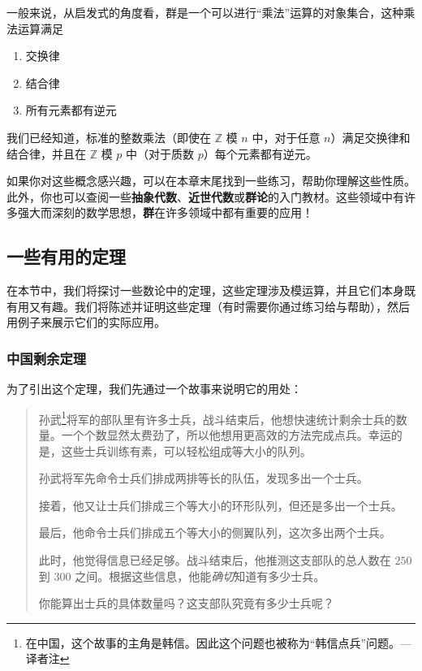 一般来说，从启发式的角度看，群是一个可以进行``乘法''运算的对象集合，这种乘法运算满足
\begin{enumerate}[label=(\alph*)]
    \item 交换律
    \item 结合律
    \item 所有元素都有逆元
\end{enumerate}
我们已经知道，标准的整数乘法（即使在 $\mathbb{Z}$ 模 $n$ 中，对于任意 $n$）满足交换律和结合律，并且在 $\mathbb{Z}$ 模 $p$ 中（对于质数 $p$）每个元素都有逆元。

如果你对这些概念感兴趣，可以在本章末尾找到一些练习，帮助你理解这些性质。此外，你也可以查阅一些\textbf{抽象代数}、\textbf{近世代数}或\textbf{群论}的入门教材。这些领域中有许多强大而深刻的数学思想，\textbf{群}在许多领域中都有重要的应用！

\subsection{一些有用的定理}

在本节中，我们将探讨一些数论中的定理，这些定理涉及模运算，并且它们本身既有用又有趣。我们将陈述并证明这些定理（有时需要你通过练习给与帮助），然后用例子来展示它们的实际应用。

\subsubsection*{中国剩余定理}

为了引出这个定理，我们先通过一个故事来说明它的用处：

\begin{quote}
    孙武\footnote{在中国，这个故事的主角是韩信。因此这个问题也被称为``韩信点兵''问题。--- 译者注}将军的部队里有许多士兵，战斗结束后，他想快速统计剩余士兵的数量。一个个数显然太费劲了，所以他想用更高效的方法完成点兵。幸运的是，这些士兵训练有素，可以轻松组成等大小的队列。

    孙武将军先命令士兵们排成两排等长的队伍，发现多出一个士兵。

    接着，他又让士兵们排成三个等大小的环形队列，但还是多出一个士兵。

    最后，他命令士兵们排成五个等大小的侧翼队列，这次多出两个士兵。

    此时，他觉得信息已经足够。战斗结束后，他推测这支部队的总人数在 $250$ 到 $300$ 之间。根据这些信息，他能\emph{确切}知道有多少士兵。
    
    你能算出士兵的具体数量吗？这支部队究竟有多少士兵呢？
\end{quote}

